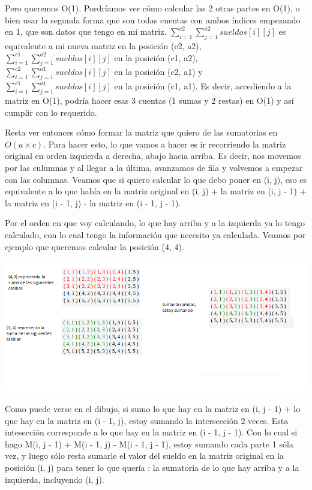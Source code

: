 Pero queremos O(1). Pordríamos ver cómo calcular las 2 otras partes en O(1), o bien usar la segunda forma que son todas cuentas con ambos índices empezando en 1, que son datos que tengo en mi matriz. $\sum_{i = 1}^{c2} \sum_{j = 1}^{a2} sueldos[i][j]$ es equivalente a mi nueva matriz en la posición (c2, a2), $\sum_{i = 1}^{c1} \sum_{j = 1}^{a2} sueldos[i][j]$ en la posición (c1, a2), $\sum_{i = 1}^{c2} \sum_{j = 1}^{a1} sueldos[i][j]$ en la posición (c2, a1) y $\sum_{i = 1}^{c1} \sum_{j = 1}^{a1} sueldos[i][j]$ en la posición (c1, a1). Es decir, accediendo a la matriz en O(1), podría hacer esas 3 cuentas (1 sumas y 2 restas) en O(1) y así cumplir con lo requerido.  \newline

Resta ver entonces cómo formar la matriz que quiero de las sumatorias en $O(a \times c)$. Para hacer esto, lo que vamos a hacer es ir recorriendo la matriz original en orden izquierda a derecha, abajo hacia arriba. Es decir, nos movemos por las culumnas y al llegar a la última, avanzamos de fila y volvemos a empezar con las columnas. Veamos que si quiero calcular lo que debo poner en (i, j), eso es equivalente a lo que había en la matriz original en (i, j) + la matriz en (i, j - 1) + la matriz en (i - 1, j) - la matriz en (i - 1, j - 1).  \newline

Por el orden en que voy calculando, lo que hay arriba y a la izquierda ya lo tengo calculado, con lo cual tengo la información que necesito ya calculada. Veamos por ejemplo que queremos calcular la posición (4, 4).

\includegraphics[scale=0.5]{img/tabla.jpg}

Como puede verse en el dibujo, si sumo lo que hay en la matriz en (i, j - 1) + lo que hay en la matriz en (i - 1, j), estoy sumando la intersección 2 veces. Esta intesección corresponde a lo que hay en la matriz en (i - 1, j - 1). Con lo cual si hago M(i, j - 1) + M(i - 1, j) - M(i - 1, j - 1), estoy sumando cada parte 1 sóla vez, y luego sólo resta sumarle el valor del sueldo en la matriz original en la posición (i, j) para tener lo que quería : la sumatoria de lo que hay arriba y a la izquierda, incluyendo (i, j). \newline

